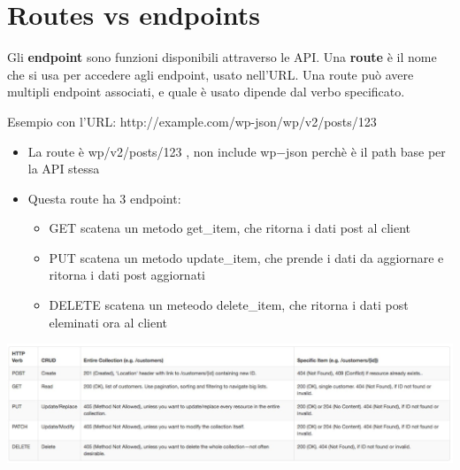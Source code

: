 \section{Routes vs endpoints}
Gli \textbf{endpoint} sono funzioni disponibili attraverso le API. Una \textbf{route} è il nome che si usa per accedere agli endpoint, usato nell'URL. Una route può avere multipli endpoint associati, e quale è usato dipende dal verbo specificato. 

Esempio con l'URL: http://example.com/wp-json/wp/v2/posts/123

\begin{itemize}
    \item La route è wp/v2/posts/123 , non include wp$-$json perchè è il path base per la API stessa
    \item Questa route ha 3 endpoint:
    \begin{itemize}
        \item GET scatena un metodo get\_item, che ritorna i dati post al client
        \item PUT scatena un metodo update\_item, che prende i dati da aggiornare e ritorna i dati post aggiornati
        \item DELETE scatena un meteodo delete\_item, che ritorna i dati post eleminati ora al client
    \end{itemize}
\end{itemize}

\begin{center}
    \includegraphics[scale = 0.4]{Images/SOA/HTTP.jpg}
\end{center}

